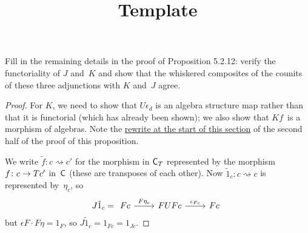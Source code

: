 \documentclass[../../solutions]{subfiles}
\title{Template}
\author{}
\begin{document}
\maketitle

%

\begin{exercise}
  Fill in the remaining details in the proof of Proposition 5.2.12:
  verify the functoriality of $J$ and~$K$ and show that the whiskered
  composites of the counits of these three adjunctions with $K$
  and~$J$ agree.
\end{exercise}

\begin{proof}
  For $K$, we need to show that $U\epsilon_d$ is an algebra structure
  map rather than that it is functorial (which has already been
  shown); we also show that $Kf$~is a morphism of algebras.  Note the
  \hyperref[prop:5.2.12]{rewrite at the start of this section} of the
  second half of the proof of this proposition.

  We write $\tilde f\colon c\rightsquigarrow c'$ for the morphism in
  ${\mathsf{C}}_T$ represented by the morphism ${f}\colon{c}\to{Tc'}$ in~${\mathsf{C}}$
  (these are transposes of each other).  Now $\tilde 1_c\colon
  c\rightsquigarrow c$ is represented by~$\eta_c$, so
  $$J\tilde 1_c =
  \begin{tikzcd}[ampersand replacement=\&]
    Fc
    \ar[r, "F\eta_c"]
    \& FUFc
    \ar[r, "\epsilon_{Fc}"]
    \& Fc
  \end{tikzcd}
  $$
  but $\epsilon F\cdot F\eta = 1_F$, so $J\tilde 1_c=1_{Fc}=1_{Jc}$.


\end{proof}
\end{document}
